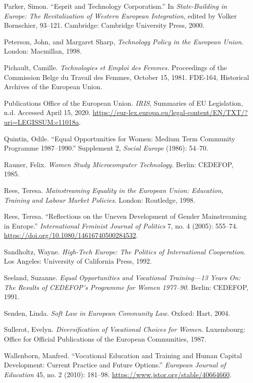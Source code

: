 \documentclass{tufte-handout}
\begin{document}
\begin{hangparas}{.25in}{1}
Parker, Simon. ``Esprit and Technology Corporatism.'' In
\emph{State-Building in Europe: The Revitalization of Western European
Integration}, edited by Volker Bornschier, 93--121. Cambridge: Cambridge
University Press, 2000.

Peterson, John, and Margaret Sharp, \emph{Technology Policy in the
European Union.} London: Macmillan, 1998.

Pichault, Camille. \emph{Technologies et Emploi des Femmes.} Proceedings
of the Commission Belge du Travail des Femmes\emph{,} October 15, 1981.
FDE-164, Historical Archives of the European Union.

Publications Office of the European Union. \emph{IRIS}, Summaries of EU
Legislation, n.d. Accessed April 15, 2020.
\url{https://eur-lex.europa.eu/legal-content/EN/TXT/?uri=LEGISSUM:c11018a}.

Quintin, Odile. ``Equal Opportunities for Women: Medium Term Community
Programme 1987--1990.'' Supplement 2, \emph{Social Europe} (1986):
54--70.

Rauner, Felix. \emph{Women Study Microcomputer Technology.} Berlin:
CEDEFOP, 1985.

Rees, Teresa. \emph{Mainstreaming Equality in the European Union:
Education, Training and Labour Market Policies}. London: Routledge,
1998.

Rees, Teresa. ``Reflections on the Uneven Development of Gender
Mainstreaming in Europe.'' \emph{International Feminist Journal of
Politics} 7, no. 4 (2005): 555--74.
\url{https://doi.org/10.1080/14616740500284532}.

Sandholtz, Wayne. \emph{High-Tech Europe: The Politics of International
Cooperation}. Los Angeles: University of California Press, 1992.

Seeland, Suzanne. \emph{Equal Opportunities and Vocational Training---13
Years On: The Results of CEDEFOP's Programme for Women 1977--90}.
Berlin: CEDEFOP, 1991.

Senden, Linda. \emph{Soft Law in European Community Law.} Oxford: Hart,
2004.

Sullerot, Evelyn. \emph{Diversification of Vocational Choices for
Women.} Luxembourg: Office for Official Publications of the European
Communities, 1987.

Wallenborn, Manfred. ``Vocational Education and Training and Human
Capital Development: Current Practice and Future Options.''
\emph{European Journal of Education} 45, no. 2 (2010): 181--98.
\url{https://www.jstor.org/stable/40664660}.


\end{hangparas}
\end{document}
